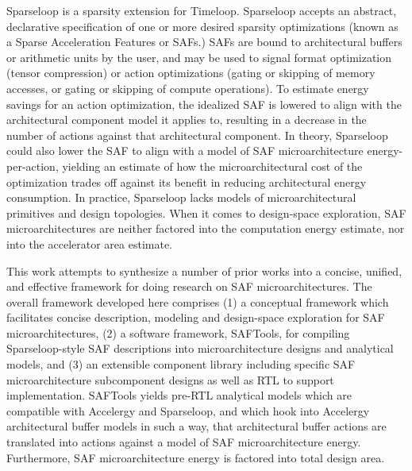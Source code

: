 Sparseloop\cite{sparseloop} is a sparsity extension for Timeloop. Sparseloop accepts an abstract, declarative specification of one or more desired sparsity optimizations (known as a Sparse Acceleration Features or SAFs.) SAFs are bound to architectural buffers or arithmetic units by the user, and may be used to signal format optimization (tensor compression) or action optimizations (gating or skipping of memory accesses, or gating or skipping of compute operations)\cite{sparseloop}. To estimate energy savings for an action optimization, the idealized SAF is lowered to align with the architectural component model it applies to, resulting in a decrease in the number of actions against that architectural component. In theory, Sparseloop could also lower the SAF to align with a model of SAF microarchitecture energy-per-action, yielding an estimate of how the microarchitectural cost of the optimization trades off against its benefit in reducing architectural energy consumption. In practice, Sparseloop lacks models of microarchitectural primitives and design topologies. When it comes to design-space exploration, SAF microarchitectures are neither factored into the computation energy estimate, nor into the accelerator area estimate.

This work attempts to synthesize a number of prior works into a concise, unified, and effective framework for doing research on SAF microarchitectures. The overall framework developed here comprises (1) a conceptual framework which facilitates concise description, modeling and design-space exploration for SAF microarchitectures, (2) a software framework, SAFTools, for compiling Sparseloop-style SAF descriptions into microarchitecture designs and analytical models, and (3) an extensible component library including specific SAF microarchitecture subcomponent designs as well as RTL to support implementation. SAFTools yields pre-RTL analytical models which are compatible with Accelergy and Sparseloop, and which hook into Accelergy architectural buffer models in such a way, that architectural buffer actions are translated into actions against a model of SAF microarchitecture energy. Furthermore, SAF microarchitecture energy is factored into total design area. 

